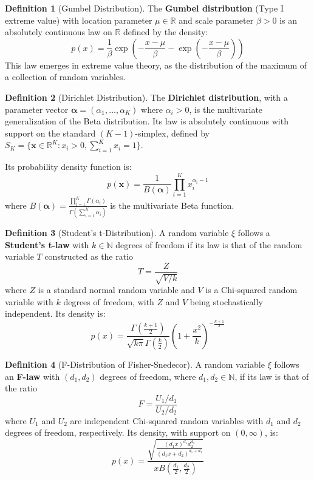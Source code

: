 \documentclass[12pt, openany]{book}
\theoremstyle{definition}
\newtheorem{definition}{Definition}[section]
\theoremstyle{plain}
\theoremstyle{remark}
\newcommand{\R}{\mathbb{R}}
\begin{document}
\begin{definition}[Gumbel Distribution]
The \textbf{Gumbel distribution} (Type I extreme value) with location parameter $\mu \in \R$ and scale parameter $\beta > 0$ is an absolutely continuous law on $\R$ defined by the density:
$$ p(x) = \frac{1}{\beta} \exp\left(-\frac{x-\mu}{\beta} - \exp\left(-\frac{x-\mu}{\beta}\right)\right) $$
This law emerges in extreme value theory, as the distribution of the maximum of a collection of random variables.
\end{definition}

\begin{definition}[Dirichlet Distribution]
The \textbf{Dirichlet distribution}, with a parameter vector $\boldsymbol{\alpha} = (\alpha_1, \dots, \alpha_K)$ where $\alpha_i > 0$, is the multivariate generalization of the Beta distribution. Its law is absolutely continuous with support on the standard $(K-1)$-simplex, defined by $S_K = \{\mathbf{x} \in \R^K : x_i > 0, \sum_{i=1}^K x_i = 1\}$.

Its probability density function is:
$$ p(\mathbf{x}) = \frac{1}{B(\boldsymbol{\alpha})} \prod_{i=1}^K x_i^{\alpha_i - 1} $$
where $B(\boldsymbol{\alpha}) = \frac{\prod_{i=1}^K \Gamma(\alpha_i)}{\Gamma(\sum_{i=1}^K \alpha_i)}$ is the multivariate Beta function.
\end{definition}

\begin{definition}[Student's t-Distribution]
A random variable $\xi$ follows a \textbf{Student's t-law} with $k \in \mathbb{N}$ degrees of freedom if its law is that of the random variable $T$ constructed as the ratio
$$ T = \frac{Z}{\sqrt{V/k}} $$
where $Z$ is a standard normal random variable and $V$ is a Chi-squared random variable with $k$ degrees of freedom, with $Z$ and $V$ being stochastically independent. Its density is:
$$ p(x) = \frac{\Gamma(\frac{k+1}{2})}{\sqrt{k\pi}\Gamma(\frac{k}{2})} \left(1 + \frac{x^2}{k}\right)^{-\frac{k+1}{2}} $$
\end{definition}

\begin{definition}[F-Distribution of Fisher-Snedecor]
A random variable $\xi$ follows an \textbf{F-law} with $(d_1, d_2)$ degrees of freedom, where $d_1, d_2 \in \mathbb{N}$, if its law is that of the ratio
$$ F = \frac{U_1/d_1}{U_2/d_2} $$
where $U_1$ and $U_2$ are independent Chi-squared random variables with $d_1$ and $d_2$ degrees of freedom, respectively. Its density, with support on $(0, \infty)$, is:
$$ p(x) = \frac{\sqrt{\frac{(d_1 x)^{d_1} d_2^{d_2}}{(d_1 x + d_2)^{d_1+d_2}}}}{x B(\frac{d_1}{2}, \frac{d_2}{2})} $$
\end{definition}
\end{document}
